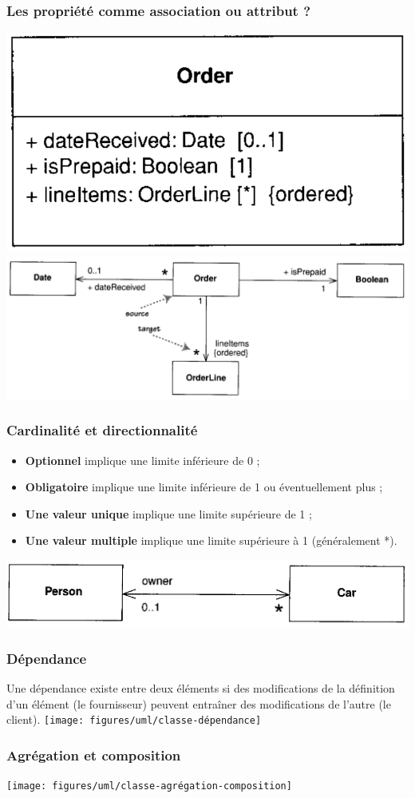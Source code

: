\begin{frame}
    \frametitle{Les propriété comme association ou attribut ?}
    \centering
    \includegraphics[height=0.15\linewidth]{figures/uml/classe-propriétés-1}
    \vfill
    \includegraphics[height=0.25\linewidth]{figures/uml/classe-propriétés-2}
\end{frame}

\begin{frame}
    \frametitle{Cardinalité et directionnalité}
    \begin{itemize}
        \item \textbf{Optionnel} implique une limite inférieure de 0 ;
        \item \textbf{Obligatoire} implique une limite inférieure de 1 ou éventuellement plus ;
        \item \textbf{Une valeur unique} implique une limite supérieure de 1 ;
        \item \textbf{Une valeur multiple} implique une limite supérieure à 1 (généralement *).
    \end{itemize}
    \vfill
    \includegraphics[width=\textwidth]{figures/uml/classe-bidirectionnelle}
\end{frame}

\begin{frame}
    \frametitle{Dépendance}
    Une dépendance existe entre deux éléments si des
    modifications de la définition d'un élément (le fournisseur)
    peuvent entraîner des modifications de l'autre (le client).
    \vfill
    \texttt{[image: figures/uml/classe-dépendance]}
\end{frame}

\begin{frame}
    \frametitle{Agrégation et composition}
    \centering
    \texttt{[image: figures/uml/classe-agrégation-composition]}
\end{frame}

